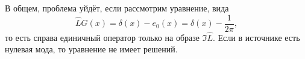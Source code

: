 
В общем, проблема уйдёт, если рассмотрим уравнение, вида
\begin{equation*}
    \hat{L} G(x) = \delta(x) - e_0(x) = \delta(x) - \frac{1}{2 \pi},
\end{equation*}
то есть справа единичный оператор только на образе $\Im \hat{L}$. 
Если в источнике есть нулевая мода, то уравнение не имеет решений. 

